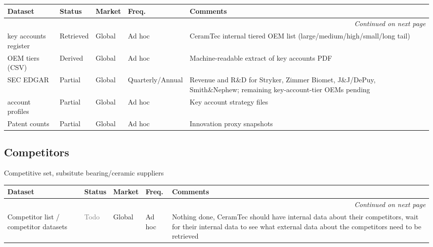 \documentclass{article}
\begin{document}
\small
\setlength{\tabcolsep}{4pt}
\renewcommand{\arraystretch}{1.15}
\begin{longtable}{@{}p{3.0cm}p{2.0cm}p{2.1cm}p{1.9cm}p{5.8cm}@{}}
\toprule
\textbf{Dataset} & \textbf{Status} & \textbf{Market} & \textbf{Freq.} & \textbf{Comments} \\
\midrule
\endhead
\midrule
\multicolumn{5}{r}{\textit{Continued on next page}} \\
\endfoot
\bottomrule
\endlastfoot
key accounts register & \textcolor{green!60!black}{Retrieved} & Global & Ad hoc & CeramTec internal tiered OEM list (large/medium/high/small/long tail) \\
OEM tiers (CSV) & \textcolor{green!60!black}{Derived} & Global & Ad hoc & Machine-readable extract of key accounts PDF \\
SEC EDGAR & \textcolor{orange!85!black}{Partial} & Global & Quarterly/\allowbreak Annual & Revenue and R\&D for Stryker, Zimmer Biomet, J\&J/DePuy, Smith\&Nephew; remaining key-account-tier OEMs pending \\
account profiles & \textcolor{orange!85!black}{Partial} & Global & Ad hoc & Key account strategy files \\
Patent counts & \textcolor{orange!85!black}{Partial} & Global & Ad hoc & Innovation proxy snapshots \\
\end{longtable}
\normalsize

\subsection{Competitors}
Competitive set, subsitute bearing/ceramic suppliers\\[0.5em]

\small
\setlength{\tabcolsep}{4pt}
\renewcommand{\arraystretch}{1.15}
\begin{longtable}{@{}p{3.0cm}p{2.0cm}p{2.1cm}p{1.9cm}p{5.8cm}@{}}
\toprule
\textbf{Dataset} & \textbf{Status} & \textbf{Market} & \textbf{Freq.} & \textbf{Comments} \\
\midrule
\endhead
\midrule
\multicolumn{5}{r}{\textit{Continued on next page}} \\
\endfoot
\bottomrule
\endlastfoot
Competitor list / competitor datasets & \textcolor{gray}{Todo} & Global & Ad hoc & Nothing done, CeramTec should have internal data about their competitors, wait for their internal data to see what external data about the competitors need to be retrieved \\
\end{longtable}
\normalsize
\end{document}
